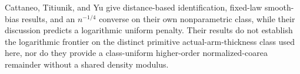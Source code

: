 Cattaneo, Titiunik, and Yu give distance-based identification, fixed-law smooth-bias results, and an \(n^{-1/4}\) converse on their own nonparametric class, while their discussion predicts a logarithmic uniform penalty.  Their results do not establish the logarithmic frontier on the distinct primitive actual-arm-thickness class used here, nor do they provide a class-uniform higher-order normalized-coarea remainder without a shared density modulus.